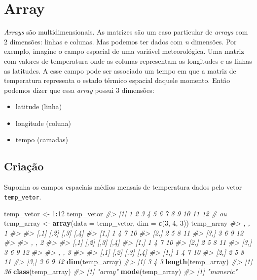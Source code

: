 \documentclass[]{book}
\newenvironment{Shaded}{\begin{snugshade}}{\end{snugshade}}
\newcommand{\KeywordTok}[1]{\textcolor[rgb]{0.13,0.29,0.53}{\textbf{#1}}}
\newcommand{\DataTypeTok}[1]{\textcolor[rgb]{0.13,0.29,0.53}{#1}}
\newcommand{\DecValTok}[1]{\textcolor[rgb]{0.00,0.00,0.81}{#1}}
\newcommand{\StringTok}[1]{\textcolor[rgb]{0.31,0.60,0.02}{#1}}
\newcommand{\CommentTok}[1]{\textcolor[rgb]{0.56,0.35,0.01}{\textit{#1}}}
\newcommand{\OperatorTok}[1]{\textcolor[rgb]{0.81,0.36,0.00}{\textbf{#1}}}
\newcommand{\NormalTok}[1]{#1}
\begin{document}
\section{Array}\label{array}

\emph{Arrays} são multidimensionais. As matrizes são um caso particular
de \emph{arrays} com 2 dimensões: linhas e colunas. Mas podemos ter
dados com \emph{n} dimensões. Por exemplo, imagine o campo espacial de
uma variável meteorológica. Uma matriz com valores de temperatura onde
as colunas representam as longitudes e as linhas as latitudes. A esse
campo pode ser associado um tempo em que a matriz de temperatura
representa o estado térmico espacial daquele momento. Então podemos
dizer que essa \emph{array} possui 3 dimensões:

\begin{itemize}
\item
  latitude (linha)
\item
  longitude (coluna)
\item
  tempo (camadas)
\end{itemize}

\subsection{Criação}\label{criacao-1}

Suponha os campos espaciais médios mensais de temperatura dados pelo
vetor \texttt{temp\_vetor}.

\begin{Shaded}
\begin{Highlighting}[]
\NormalTok{temp_vetor <-}\StringTok{ }\DecValTok{1}\OperatorTok{:}\DecValTok{12}
\NormalTok{temp_vetor}
\CommentTok{#>  [1]  1  2  3  4  5  6  7  8  9 10 11 12}
\CommentTok{# ou}
\NormalTok{temp_array <-}\StringTok{ }\KeywordTok{array}\NormalTok{(}\DataTypeTok{data =}\NormalTok{ temp_vetor, }\DataTypeTok{dim =} \KeywordTok{c}\NormalTok{(}\DecValTok{3}\NormalTok{, }\DecValTok{4}\NormalTok{, }\DecValTok{3}\NormalTok{))}
\NormalTok{temp_array}
\CommentTok{#> , , 1}
\CommentTok{#> }
\CommentTok{#>      [,1] [,2] [,3] [,4]}
\CommentTok{#> [1,]    1    4    7   10}
\CommentTok{#> [2,]    2    5    8   11}
\CommentTok{#> [3,]    3    6    9   12}
\CommentTok{#> }
\CommentTok{#> , , 2}
\CommentTok{#> }
\CommentTok{#>      [,1] [,2] [,3] [,4]}
\CommentTok{#> [1,]    1    4    7   10}
\CommentTok{#> [2,]    2    5    8   11}
\CommentTok{#> [3,]    3    6    9   12}
\CommentTok{#> }
\CommentTok{#> , , 3}
\CommentTok{#> }
\CommentTok{#>      [,1] [,2] [,3] [,4]}
\CommentTok{#> [1,]    1    4    7   10}
\CommentTok{#> [2,]    2    5    8   11}
\CommentTok{#> [3,]    3    6    9   12}
\KeywordTok{dim}\NormalTok{(temp_array)}
\CommentTok{#> [1] 3 4 3}
\KeywordTok{length}\NormalTok{(temp_array)}
\CommentTok{#> [1] 36}
\KeywordTok{class}\NormalTok{(temp_array)}
\CommentTok{#> [1] "array"}
\KeywordTok{mode}\NormalTok{(temp_array)}
\CommentTok{#> [1] "numeric"}
\end{Highlighting}
\end{Shaded}
\end{document}
